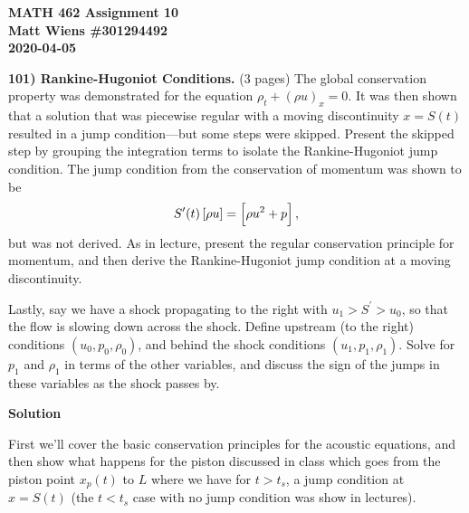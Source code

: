 \documentclass{article}
\begin{document}
\textbf{MATH 462 Assignment 10} \\
\textbf{Matt Wiens \#301294492} \\
\textbf{2020-04-05}

\textbf{101) Rankine-Hugoniot Conditions.} (3 pages)
The global conservation property was demonstrated for the equation
$\rho_t + (\rho u)_x = 0$. It was then shown that a solution that was
piecewise regular with a moving discontinuity $x = S(t)$ resulted in a
jump condition---but some steps were skipped. Present the skipped step
by grouping the integration terms to isolate the Rankine-Hugoniot jump
condition. The jump condition from the conservation of momentum was
shown to be
%
\begin{equation*}
    S^\prime(t) \sbr{\rho u} = \sbr{\rho u^2 + p}
    ,
\end{equation*}
%
but was not derived. As in lecture, present the regular conservation
principle for momentum, and then derive the Rankine-Hugoniot jump
condition at a moving discontinuity.

Lastly, say we have a shock propagating to the right with $u_1 >
S^\prime > u_0$, so that the flow is slowing down across the shock.
Define upstream (to the right) conditions $(u_0, p_0, \rho_0)$, and
behind the shock conditions $(u_1, p_1, \rho_1)$. Solve for $p_1$ and
$\rho_1$ in terms of the other variables, and discuss the sign of the
jumps in these variables as the shock passes by.

\newpage

\textbf{Solution}

First we'll cover the basic conservation principles for the acoustic
equations, and then show what happens for the piston discussed in class
which goes from the piston point $x_p(t)$ to $L$ where we have for $t >
t_s$, a jump condition at $x = S(t)$ (the $t < t_s$ case with no jump
condition was show in lectures).
\end{document}
